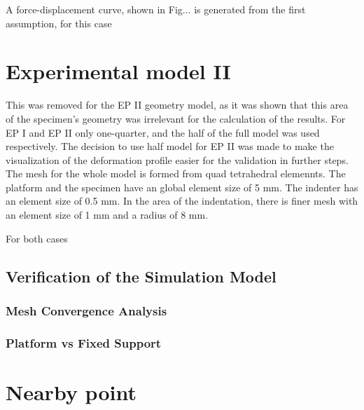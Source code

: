 A force-displacement curve, shown in Fig... is generated from the first assumption, 
for this case 

\section*{Experimental model II}
This was removed for the EP II geometry model, as it was shown that this area 
of the specimen's geometry was irrelevant for the calculation of the results.
For EP I and EP II only one-quarter, and the half of the full model was used respectively.
The decision to use half model for EP II was made to make the visualization of the deformation profile 
easier for the validation in further steps.\\

The mesh for the whole model is formed from quad tetrahedral elemennts. The platform and 
the specimen have an global element size of 5 mm. The indenter has an element size of
0.5 mm. In the area of the indentation, there is finer mesh with an element size of
1 mm and a radius of 8 mm. 



For both cases 

\subsection{Verification of the Simulation Model}

\subsubsection*{Mesh Convergence Analysis}
\subsubsection*{Platform vs Fixed Support}


\section{Nearby point}


